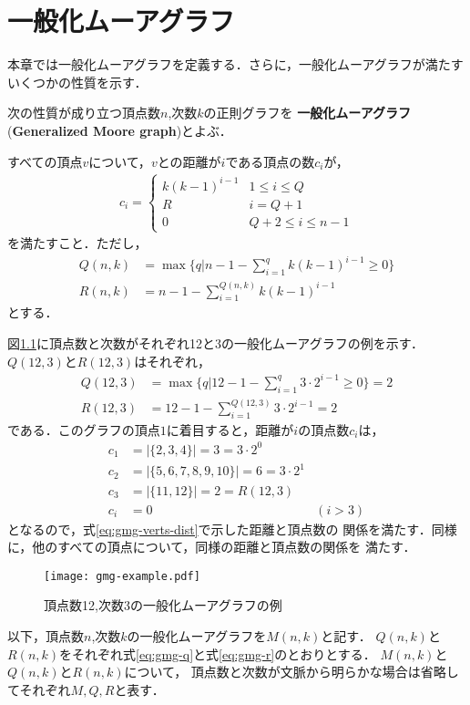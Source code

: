 
\chapter{一般化ムーアグラフ}
\label{chap:generalized-moore-graph}
本章では一般化ムーアグラフを定義する．さらに，一般化ムーアグラフが満たす
いくつかの性質を示す．
\begin{definition}\rm
  \label{def:generalized-moore-graph}
  次の性質が成り立つ頂点数$n$,次数$k$の正則グラフを
  \textbf{一般化ムーアグラフ}(\textbf{Generalized Moore graph})とよぶ．

  すべての頂点$v$について，$v$との距離が$i$である頂点の数$c_i$が，
  \begin{equation}
    \label{eq:gmg-verts-dist}
    \begin{aligned}
      c_i =
      \begin{cases}
        k(k-1)^{i-1} & 1\leq i\leq Q \\
        R & i = Q+1 \\
        0 & Q+2\leq i \leq n-1
      \end{cases}
    \end{aligned}
  \end{equation}
  を満たすこと．ただし，
  \begin{align}
    Q(n,k)&=\max\{q|n-1-\sum_{i=1}^{q}k(k-1)^{i-1}\geq 0\}\label{eq:gmg-q} \\
    R(n,k)&=n-1-\sum_{i=1}^{Q(n,k)}k(k-1)^{i-1}\label{eq:gmg-r}
  \end{align}
  とする．
\end{definition}
\begin{example}\rm
  図\ref{fig:gmg-example}に頂点数と次数がそれぞれ12と3の一般化ムーアグラフの例を示す．
  $Q(12,3)$と$R(12,3)$はそれぞれ，
  \begin{align*}
    Q(12,3) &= \max\{q | 12-1-\sum_{i=1}^{q}3\cdot2^{i-1} \geq 0\} = 2 \\
    R(12,3) &= 12 - 1 - \sum_{i=1}^{Q(12,3)}3\cdot2^{i-1} = 2
  \end{align*}
  である．このグラフの頂点$1$に着目すると，距離が$i$の頂点数$c_i$は，
  \begin{align*}
    c_1&= |\{2,3,4\}| = 3 = 3\cdot2^0 & \\
    c_2&= |\{5,6,7,8,9,10\}| = 6 = 3\cdot2^1 & \\
    c_3&= |\{11,12\}| = 2 = R(12,3) & \\
    c_i&= 0 & (i>3)
  \end{align*}
  となるので，式\ref{eq:gmg-verts-dist}で示した距離と頂点数の
  関係を満たす．同様に，他のすべての頂点について，同様の距離と頂点数の関係を
  満たす．
  \begin{figure}
    \centering
    \texttt{[image: gmg-example.pdf]}
    \caption{頂点数12,次数3の一般化ムーアグラフの例}
    \label{fig:gmg-example}
  \end{figure}
\end{example}
以下，頂点数$n$,次数$k$の一般化ムーアグラフを$M(n,k)$と記す．
$Q(n,k)$と$R(n,k)$をそれぞれ式\ref{eq:gmg-q}と式\ref{eq:gmg-r}のとおりとする．
$M(n,k)$と$Q(n,k)$と$R(n,k)$について，
頂点数と次数が文脈から明らかな場合は省略してそれぞれ$M,Q,R$と表す．

